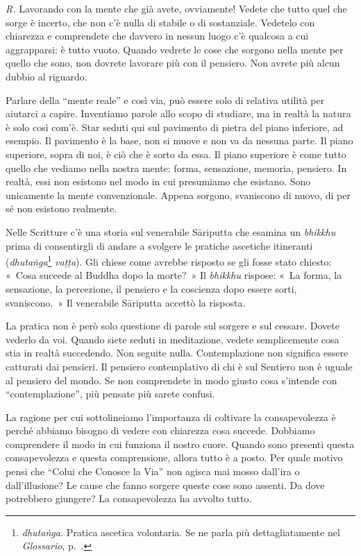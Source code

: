 \emph{R.} Lavorando con la mente che già avete, ovviamente! Vedete che tutto
quel che sorge è incerto, che non c'è nulla di stabile o di sostanziale.
Vedetelo con chiarezza e comprendete che davvero in nessun luogo c'è
qualcosa a cui aggrapparsi: è tutto vuoto. Quando vedrete le cose che
sorgono nella mente per quello che sono, non dovrete lavorare più con il
pensiero. Non avrete più alcun dubbio al riguardo.

Parlare della ``mente reale'' e così via, può essere solo di relativa
utilità per aiutarci a capire. Inventiamo parole allo scopo di studiare,
ma in realtà la natura è solo così com'è. Star seduti qui sul pavimento
di pietra del piano inferiore, ad esempio. Il pavimento è la base, non
si muove e non va da nessuna parte. Il piano superiore, sopra di noi, è
ciò che è sorto da essa. Il piano superiore è come tutto quello che
vediamo nella nostra mente: forma, sensazione, memoria, pensiero. In
realtà, essi non esistono nel modo in cui presumiamo che esistano. Sono
unicamente la mente convenzionale. Appena sorgono, svaniscono di nuovo,
di per sé non esistono realmente.

\enlargethispage*{\baselineskip}

Nelle Scritture c'è una storia sul venerabile Sāriputta che esamina un
\emph{bhikkhu} prima di
consentirgli di andare a svolgere le pratiche ascetiche itineranti
(\emph{dhutaṅga}\footnote{\emph{dhutaṅga.} Pratica ascetica volontaria.
  Se ne parla più dettagliatamente nel
  \emph{Glossario}, p.~\pageref{glossary-dhutanga}.} \emph{vaṭṭa}). Gli chiese come avrebbe risposto se
gli fosse stato chiesto: «~Cosa succede al Buddha dopo la morte?~» Il
\emph{bhikkhu} rispose: «~La forma, la sensazione, la percezione, il
pensiero e la coscienza dopo essere sorti, svaniscono.~» Il venerabile
Sāriputta accettò la risposta.

La pratica non è però solo questione di parole sul sorgere e sul
cessare. Dovete vederlo da voi. Quando siete seduti in meditazione,
vedete semplicemente cosa stia in realtà succedendo. Non seguite nulla.
Contemplazione non significa essere catturati dai pensieri. Il pensiero
contemplativo di chi è sul Sentiero non è uguale al pensiero del mondo.
Se non comprendete in modo giusto cosa s'intende con ``contemplazione'',
più pensate più sarete confusi.

La ragione per cui sottolineiamo l'importanza di coltivare la
consapevolezza è perché abbiamo bisogno di vedere con chiarezza cosa
succede. Dobbiamo comprendere il modo in cui funziona il nostro cuore.
Quando sono presenti questa consapevolezza e questa comprensione, allora
tutto è a posto. Per quale motivo pensi che ``Colui che Conosce la Via''
non agisca mai mosso dall'ira o dall'illusione? Le cause che fanno
sorgere queste cose sono assenti. Da dove potrebbero giungere? La
consapevolezza ha avvolto tutto.

